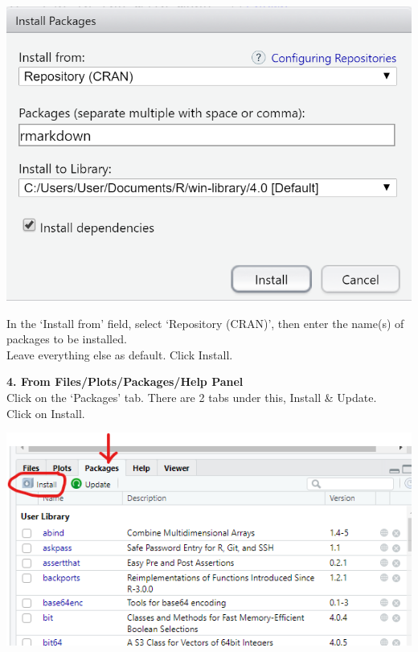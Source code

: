 \documentclass[
]{book}
\let\origfigure\figure
\let\endorigfigure\endfigure
\renewenvironment{figure}[1][2] {
    \expandafter\origfigure\expandafter[H]
} {
    \endorigfigure
}
\begin{document}
\begin{figure}
\centering
\includegraphics{tutorial_screenshots/install_rmkdn_toolstab.png}
\caption{install packages from menu bar}
\end{figure}

In the `Install from' field, select `Repository (CRAN)', then enter the name(s) of packages to be installed.\\
Leave everything else as default. Click Install.

\textbf{4. From Files/Plots/Packages/Help Panel}\\
Click on the `Packages' tab. There are 2 tabs under this, Install \& Update.\\
Click on Install.

\begin{figure}
\centering
\includegraphics{tutorial_screenshots/install_packages_short.png}
\caption{install packages}
\end{figure}
\end{document}
